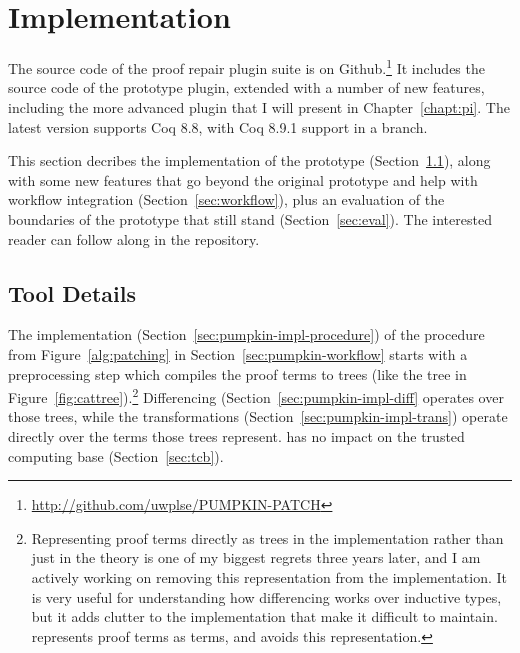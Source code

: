 \section{Implementation}
\label{sec:pumpkin-impl}

The source code of the \sysnamelong proof repair plugin suite is on Github.\footnote{\url{http://github.com/uwplse/PUMPKIN-PATCH}} %
It includes the source code of the \sysname prototype plugin, extended with a number of new features,
including the more advanced \toolnamec plugin that I will present in Chapter~\ref{chapt:pi}.
The latest version supports Coq 8.8, with Coq 8.9.1 support in a branch. %

This section decribes the implementation of the \sysname prototype (Section~\ref{sec:tool}),
along with some new features that go beyond the original prototype and help with workflow integration (Section~\ref{sec:workflow}),
plus an evaluation of the boundaries of the \sysname prototype that still stand (Section~\ref{sec:eval}).
The interested reader can follow along in the repository.

\subsection{Tool Details}
\label{sec:tool}


The implementation (Section~\ref{sec:pumpkin-impl-procedure}) of the procedure from Figure~\ref{alg:patching} in Section~\ref{sec:pumpkin-workflow}
starts with a preprocessing step which compiles the proof terms to 
trees (like the tree in Figure~\ref{fig:cattree}).\footnote{Representing proof terms directly as trees in the implementation rather
than just in the theory is one of my biggest regrets three years later, and I am actively working on removing this representation from the implementation.
It is very useful for understanding how differencing works over inductive types, but it adds clutter to the implementation that make it difficult to maintain.
\toolnamec represents proof terms as terms, and avoids this representation.}
Differencing (Section~\ref{sec:pumpkin-impl-diff} operates over those trees, 
while the transformations (Section~\ref{sec:pumpkin-impl-trans}) operate directly over the terms those trees represent.
\sysname has no impact on the trusted computing base (Section~\ref{sec:tcb}).

